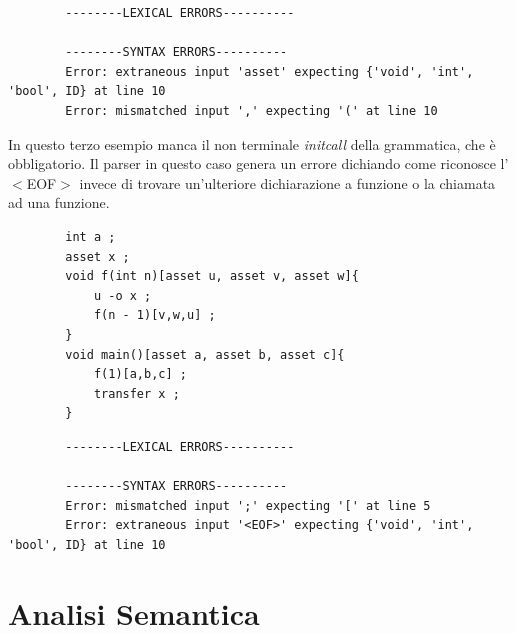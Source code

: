 \documentclass[12pt, a4paper]{report}
\begin{document}
    \begin{lstlisting}
        --------LEXICAL ERRORS----------

        --------SYNTAX ERRORS----------
        Error: extraneous input 'asset' expecting {'void', 'int', 'bool', ID} at line 10
        Error: mismatched input ',' expecting '(' at line 10
       \end{lstlisting}
   In questo terzo esempio manca il non terminale \emph{initcall} della grammatica, che è obbligatorio. Il parser in questo caso genera un errore dichiando come riconosce l'$<$EOF$>$ invece di trovare un'ulteriore dichiarazione a funzione o la chiamata ad una funzione.
    \begin{lstlisting}
        int a ; 
        asset x ;
        void f(int n)[asset u, asset v, asset w]{
            u -o x ;
            f(n - 1)[v,w,u] ;
        }
        void main()[asset a, asset b, asset c]{
            f(1)[a,b,c] ;
            transfer x ;
        }
    \end{lstlisting}
       \begin{lstlisting}
        --------LEXICAL ERRORS----------

        --------SYNTAX ERRORS----------
        Error: mismatched input ';' expecting '[' at line 5
        Error: extraneous input '<EOF>' expecting {'void', 'int', 'bool', ID} at line 10
       \end{lstlisting}    
 \chapter{Analisi Semantica}
\end{document}
